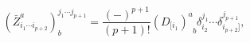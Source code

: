 \begin{equation}
\left( \bar{Z}_{i_{1}\cdots i_{p+2}}^{a}\right) _{b}^{j_{1}\cdots j_{p+1}}=%
\frac{\left( -\right) ^{p+1}}{\left( p+1\right) !}\left( D_{[i_{1}}\right)
_{\;\;b}^{a}\delta _{i_{2}}^{j_{1}}\cdots \delta _{i_{p+2}]}^{j_{p+1}},
\label{i25}
\end{equation}

